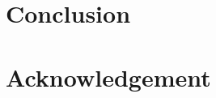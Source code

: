 \documentclass[conference,a4paper]{IEEEtran}
\begin{document}
	\section{Conclusion}        \label{sec:Conclusion}      

	\section*{Acknowledgement}  

	\newpage

%        
%        

	\begin{spacing}{0.84}
		
		
    \end{spacing}
\end{document}
